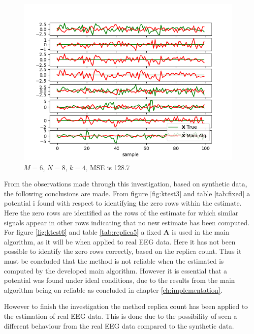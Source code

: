\begin{figure}[H]
\centering
\includegraphics[scale=0.5]{figures/ch_estimate/k_test5.png}
\caption{$M=6$, $N=8$, $k=4$, MSE is 128.7}
\label{fig:ktest5}
\end{figure}

From the observations made through this investigation, based on synthetic data, the following conclusions are made.
From figure \ref{fig:ktest3} and table \ref{tab:fixed} a potential i found with respect to identifying the zero rows within the estimate. Here the zero rows are identified as the rows of the estimate for which similar signals appear in other rows indicating that no new estimate has been computed. 
For figure \ref{fig:ktest6} and table \ref{tab:replica5} a fixed $\textbf{A}$ is used in the main algorithm, as it will be when applied to real EEG data. Here it has not been possible to identify the zero rows correctly, based on the replica count. Thus it must be concluded that the method is not reliable when the estimated is computed by the developed main algorithm. However it is essential that a potential was found under ideal conditions, due to the results from the main algorithm being on reliable as concluded in chapter \ref{ch:implementation}. 

However to finish the investigation the method replica count has been applied to the estimation of real EEG data. This is done due to the possibility of seen a different behaviour from the real EEG data compared to the synthetic data. 










